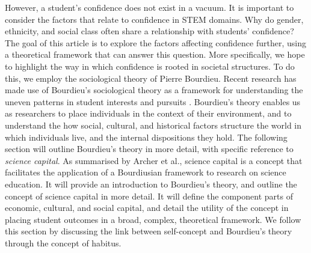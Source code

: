 However, a student's confidence does not exist in a vacuum. It is important to consider the factors that relate to confidence in STEM domains. Why do gender, ethnicity, and social class often share a relationship with students' confidence? The goal of this article is to explore the factors affecting confidence further, using a theoretical framework that can answer this question. More specifically, we hope to highlight the way in which confidence is rooted in societal structures. To do this, we employ the sociological theory of Pierre Bourdieu. Recent research has made use of Bourdieu's sociological theory as a framework for understanding the uneven patterns in student interests and pursuits \cite{archer2013aspires,Archer_2015,turnbull2019bourdieu}. Bourdieu's theory enables us as researchers to place individuals in the context of their environment, and to understand the how social, cultural, and historical factors structure the world in which individuals live, and the internal dispositions they hold. The following section will outline Bourdieu's theory in more detail, with specific reference to \textit{science capital}. As summarised by Archer et al., \cite{Archer_2015} science capital is a concept that facilitates the application of a Bourdiusian framework to research on science education. It will provide an introduction to Bourdieu's theory, and outline the concept of science capital in more detail. It will define the component parts of economic, cultural, and social capital, and detail the utility of the concept in placing student outcomes in a broad, complex, theoretical framework. We follow this section by discussing the link between self-concept and Bourdieu's theory through the concept of habitus.

